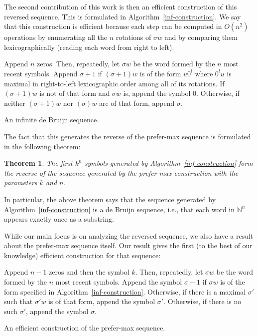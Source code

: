 \documentclass{article}
\newtheorem{theorem}{Theorem}
\theoremstyle{definition}
\newcommand{\N}{{\mathbb{N}}}
\begin{document}
The second contribution of this work is then an efficient construction of this reversed sequence. This is formulated in Algorithm~\ref{inf-construction}. We say that this construction is efficient because each step can be computed in $O(n^2)$ operations by enumerating all the $n$ rotations of $\sigma w$ and by comparing them lexicographically (reading each word from right to left).


\begin{algorithm}[!h]
	Append $n$ zeros. Then, repeatedly, let $\sigma w$ be the word formed by the $n$ most recent symbols. Append $\sigma+1$ if $(\sigma+1)w$ is of the form $u0^l$ where $0^lu$ is maximal in right-to-left lexicographic order among all of its rotations. If $(\sigma+1)w$ is not of that form and $\sigma w$ is, append the symbol $0$. Otherwise, if neither $(\sigma+1)w$ nor $(\sigma)w$ are of that form, append $\sigma$.
	\caption{An infinite de Bruijn sequence.}
	\label{inf-construction}
\end{algorithm}

The fact that this generates the reverse of the prefer-max sequence is formulated in the following theorem:
 
\begin{theorem} 
The first $k^n$ symbols generated by Algorithm~\ref{inf-construction} form the reverse of the sequence generated by the prefer-max construction with the parameters $k$ and $n$.	
\end{theorem} 

In particular, the above theorem says that the sequence generated by Algorithm~\ref{inf-construction} is a de Bruijn sequence, i.e., that each word in $\N^n$ appears exactly once as a substring.

While our main focus is on analyzing the reversed sequence, we also have a result about the prefer-max sequence itself. Our result gives the first (to the best of our knowledge) efficient construction for that sequence:

\begin{algorithm}[!h]
	Append $n-1$ zeros and then the symbol $k$. Then, repeatedly, let $\sigma w$ be the word formed by the $n$ most recent symbols. Append the symbol $\sigma-1$  if $\sigma w$  is of the form specified in Algorithm~\ref{inf-construction}. Otherwise, if there is a maximal $\sigma'$ such that $\sigma'w$ is of that form, append the symbol $\sigma'$. Otherwise, if there is no such $\sigma'$, append the symbol $\sigma$.
		
	\caption{An efficient construction of the prefer-max sequence.}
	\label{efficient-pref-max}
\end{algorithm}
\end{document}
